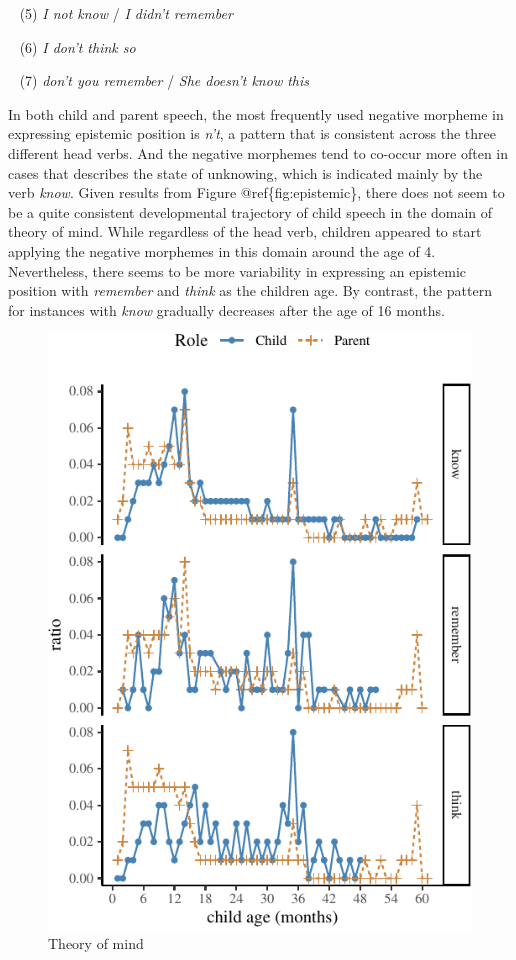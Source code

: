 \documentclass[10pt, letterpaper]{article}
\newenvironment{CodeChunk}{}{}
\begin{document}
~ (5) \emph{I not know} / \emph{I didn't remember}

~ (6) \emph{I don't think so}

~ (7) \emph{don't you remember} / \emph{She doesn't know this}

In both child and parent speech, the most frequently used negative
morpheme in expressing epistemic position is \emph{n't}, a pattern that
is consistent across the three different head verbs. And the negative
morphemes tend to co-occur more often in cases that describes the state
of unknowing, which is indicated mainly by the verb \emph{know}. Given
results from Figure @ref\{fig:epistemic\}, there does not seem to be a
quite consistent developmental trajectory of child speech in the domain
of theory of mind. While regardless of the head verb, children appeared
to start applying the negative morphemes in this domain around the age
of 4. Nevertheless, there seems to be more variability in expressing an
epistemic position with \emph{remember} and \emph{think} as the children
age. By contrast, the pattern for instances with \emph{know} gradually
decreases after the age of 16 months.

\begin{CodeChunk}
\begin{figure}[H]

{\centering \includegraphics{figs/epistemic-1} 

}

\caption[Theory of mind]{Theory of mind}\label{fig:epistemic}
\end{figure}
\end{CodeChunk}
\end{document}
